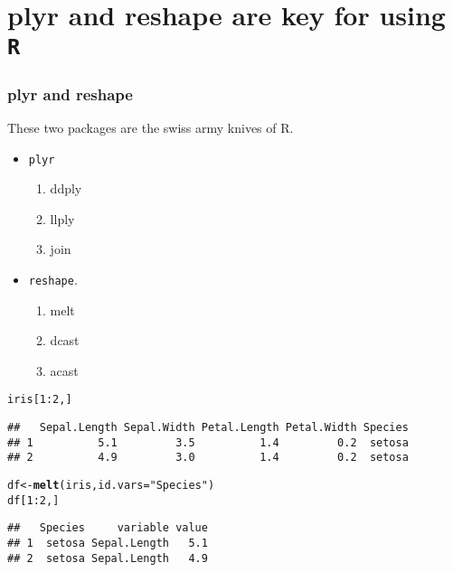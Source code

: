 \documentclass{beamer}\usepackage[]{graphicx}\usepackage[]{color}
\makeatletter
\newcommand{\hlstr}[1]{\textcolor[rgb]{0.192,0.494,0.8}{#1}}%
\newcommand{\hlkwd}[1]{\textcolor[rgb]{0.737,0.353,0.396}{\textbf{#1}}}%
\newenvironment{kframe}{%
 \def\at@end@of@kframe{}%
 \ifinner\ifhmode%
  \def\at@end@of@kframe{\end{minipage}}%
  \begin{minipage}{\columnwidth}%
 \fi\fi%
 \def\FrameCommand##1{\hskip\@totalleftmargin \hskip-\fboxsep
 \colorbox{shadecolor}{##1}\hskip-\fboxsep
     \hskip-\linewidth \hskip-\@totalleftmargin \hskip\columnwidth}%
 \MakeFramed {\advance\hsize-\width
   \@totalleftmargin\z@ \linewidth\hsize
   \@setminipage}}%
 {\par\unskip\endMakeFramed%
 \at@end@of@kframe}
\newenvironment{knitrout}{}{} %
\makeatother
\begin{document}
\section*{plyr and reshape are key for using \texttt{R}}
\frame{\sectionpage}

\begin{frame}[fragile]
\frametitle{plyr and reshape}
These two packages are the swiss army knives of R.
\begin{itemize}
\item \texttt{plyr}
    \begin{enumerate}
    \item ddply
    \item llply
    \item join
    \end{enumerate}
\item \texttt{reshape}.
    \begin{enumerate}
    \item melt
    \item dcast
    \item acast
    \end{enumerate}
\end{itemize}
\end{frame}


\begin{frame}[fragile]
\begin{knitrout}\footnotesize
{}\color{fgcolor}\begin{kframe}
\begin{alltt}
iris[1:2, ]
\end{alltt}
\begin{verbatim}
##   Sepal.Length Sepal.Width Petal.Length Petal.Width Species
## 1          5.1         3.5          1.4         0.2  setosa
## 2          4.9         3.0          1.4         0.2  setosa
\end{verbatim}
\begin{alltt}
df  <- \hlkwd{melt}(iris, id.vars = \hlstr{"Species"})
df[1:2, ]
\end{alltt}
\begin{verbatim}
##   Species     variable value
## 1  setosa Sepal.Length   5.1
## 2  setosa Sepal.Length   4.9
\end{verbatim}
\end{kframe}
\end{knitrout}

\end{frame}
\end{document}
